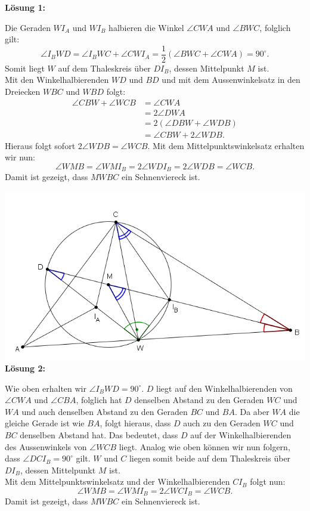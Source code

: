 \documentclass[language=german,style=solution]{smo}
\begin{document}
\begin{enumerate}
\textbf{Lösung 1:}

Die Geraden $WI_A$ und $WI_B$ halbieren die Winkel $\angle CWA$ und $\angle BWC$, folglich gilt:
\[
\angle I_BWD=\angle I_BWC+\angle CWI_A=\frac{1}{2}(\angle BWC+\angle CWA)=90^\circ.
\]
Somit liegt $W$ auf dem Thaleskreis über $DI_B$, dessen Mittelpunkt $M$ ist.\\
Mit den Winkelhalbierenden $WD$ und $BD$ und mit dem Aussenwinkelsatz in den Dreiecken $WBC$ und $WBD$ folgt:
\begin{align*}
\angle CBW+\angle WCB &=\angle CWA\\
&=2\angle DWA\\
&=2\left(\angle DBW+\angle WDB\right)\\
&=\angle CBW+2\angle WDB.
\end{align*}
Hieraus folgt sofort $2\angle WDB=\angle WCB$. Mit dem Mittelpunktswinkelsatz erhalten wir nun:
\[
\angle WMB=\angle WMI_B=2\angle WDI_B=2\angle WDB=\angle WCB.
\]
Damit ist gezeigt, dass $MWBC$ ein Sehnenviereck ist.

\includegraphics{muleo_2015.PNG}
\newpage
\textbf{Lösung 2:}

Wie oben erhalten wir $\angle I_BWD=90^\circ$. $D$ liegt auf den Winkelhalbierenden von $\angle CWA$ und $\angle CBA$, folglich hat $D$ denselben Abstand zu den Geraden $WC$ und $WA$ und auch denselben Abstand zu den Geraden $BC$ und $BA$. Da aber $WA$ die gleiche Gerade ist wie $BA$, folgt hieraus, dass $D$ auch zu den Geraden $WC$ und $BC$ denselben Abstand hat. Das bedeutet, dass $D$ auf der Winkelhalbierenden des Aussenwinkels von $\angle WCB$ liegt.
Analog wie oben können wir nun folgern, dass $\angle DCI_B=90^\circ$ gilt. $W$ und $C$ liegen somit beide auf dem Thaleskreis über $DI_B$, dessen Mittelpunkt $M$ ist.\\
Mit dem Mittelpunktswinkelsatz und der Winkelhalbierenden $CI_B$ folgt nun:
\[
\angle WMB=\angle WMI_B=2\angle WCI_B=\angle WCB.
\]
Damit ist gezeigt, dass $MWBC$ ein Sehnenviereck ist.\\


\end{enumerate}
\end{document}
